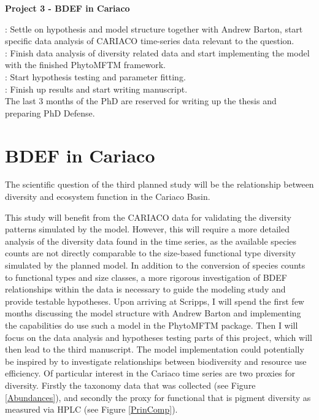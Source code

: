 {\bf{Project 3 - BDEF in Cariaco}}

: Settle on hypothesis and model structure together with Andrew Barton, start specific data analysis of CARIACO time-series data relevant to the question.\\
: Finish data analysis of diversity related data and start implementing the model with the finished PhytoMFTM framework.\\
: Start hypothesis testing and parameter fitting. \\
: Finish up results and start writing manuscript. \\


The last 3 months of the PhD are reserved for writing up the thesis and preparing PhD Defense.


\section{BDEF in Cariaco}

The scientific question of the third planned study will be the relationship between diversity and ecosystem function in the Cariaco Basin. 

This study will benefit from the CARIACO data for validating the diversity patterns simulated by the model. However, this will require a more detailed analysis of the diversity data found in the time series, as the available species counts are not directly comparable to the size-based functional type diversity simulated by the planned model. In addition to the conversion of species counts to functional types and size classes, a more rigorous investigation of BDEF relationships within the data is necessary to guide the modeling study and provide testable hypotheses. Upon arriving at Scripps, I will spend the first few months discussing the model structure with Andrew Barton and implementing the capabilities do use such a model in the PhytoMFTM package. Then I will focus on the data analysis and hypotheses testing parts of this project, which will then lead to the third manuscript. The model implementation could potentially be inspired by \citet{Loreau1998b} to investigate relationships between biodiversity and resource use efficiency. Of particular interest in the Cariaco time series are two proxies for diversity. Firstly the taxonomy data that was collected (see Figure \ref{Abundances}), and secondly the proxy for functional that is pigment diversity as measured via HPLC (see Figure \ref{PrinComp}).
 
